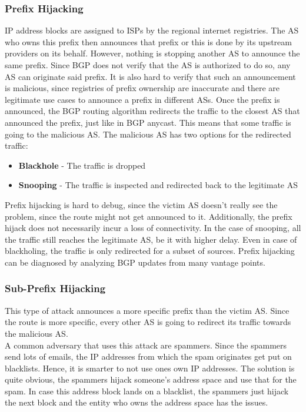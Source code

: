\subsubsection{Prefix Hijacking}
IP address blocks are assigned to ISPs by the regional internet registries. The AS who owns this prefix then announces that prefix or this is done by its upstream providers on its behalf. However, nothing is stopping another AS to announce the same prefix. Since BGP does not verify that the AS is authorized to do so, any AS can originate said prefix. It is also hard to verify that such an announcement is malicious, since registries of prefix ownership are inaccurate and there are legitimate use cases to announce a prefix in different ASs. Once the prefix is announced, the BGP routing algorithm redirects the traffic to the closest AS that announced the prefix, just like in BGP anycast. This means that some traffic is going to the malicious AS. The malicious AS has two options for the redirected traffic:
\begin{itemize}
\item \textbf{Blackhole} - The traffic is dropped
\item \textbf{Snooping} - The traffic is inspected and redirected back to the legitimate AS
\end{itemize}
Prefix hijacking is hard to debug, since the victim AS doesn't really see the problem, since the route might not get announced to it. Additionally, the prefix hijack does not necessarily incur a loss of connectivity. In the case of snooping, all the traffic still reaches the legitimate AS, be it with higher delay. Even in case of blackholing, the traffic is only redirected for a subset of sources. Prefix hijacking can be diagnosed by analyzing BGP updates from many vantage points.

\subsubsection{Sub-Prefix Hijacking}
This type of attack announces a more specific prefix than the victim AS. Since the route is more specific, every other AS is going to redirect its traffic towards the malicious AS. \\
A common adversary that uses this attack are spammers. Since the spammers send lots of emails, the IP addresses from which the spam originates get put on blacklists. Hence, it is smarter to not use ones own IP  addresses. The solution is quite obvious, the spammers hijack someone's address space and use that for the spam. In case this address block lands on a blacklist, the spammers just hijack the next block and the entity who owns the address space has the issues.

